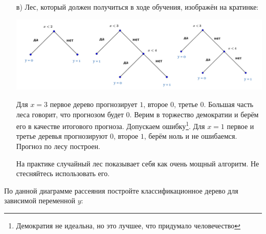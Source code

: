 \documentclass[12pt, a4paper, oneside]{article}
\theoremstyle{plain} %
\theoremstyle{definition}
\begin{document}
\begin{solution}
\begin{enumerate}
	\item[в)]   Лес, который должен получиться в ходе обучения, изображён на кратинке: 
	
	
	\begin{center}
		\includegraphics[scale=0.17]{forest.png}
	\end{center} 	
	
	Для $x=3$ первое дерево прогнозирует $1$, второе $0$, третье $0$. Большая часть леса говорит, что прогнозом будет $0$. Верим в торжество демократии и берём его в качестве итогового прогноза. Допускаем ошибку\footnote{Демократия не идеальна, но это лучшее, что придумало человечество}. Для $x=1$ первое и третье деревья прогнозируют $0$, второе $1$, берём ноль и не ошибаемся. Прогноз по лесу построен.
	
	На практике случайный лес показывает себя как очень мощный алгоритм. Не стесняйтесь использовать его. 
\end{enumerate}
\end{solution}

\begin{problem}{}
По данной диаграмме рассеяния постройте классификационное дерево для зависимой переменной $y$:

\begin{center}
	\begin{tikzpicture}[scale = 0.015]
	
	\end{tikzpicture}
\end{center}
\end{problem}
\end{document}

